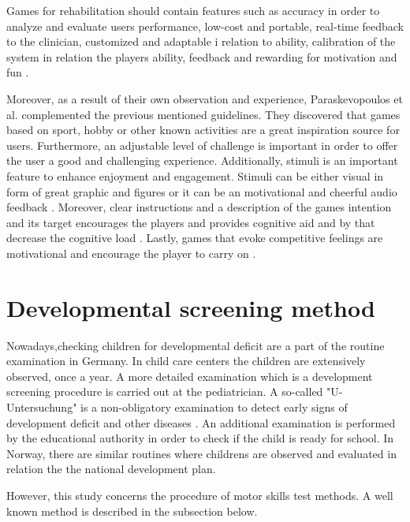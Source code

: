 Games for rehabilitation  should contain features such as accuracy in order to analyze and evaluate users performance, low-cost and portable, real-time feedback to the clinician, customized and adaptable i relation to ability, calibration of the system in relation the players ability, feedback and rewarding for motivation and fun \cite{Lewis2012}.

Moreover, as a result of their own observation and experience, Paraskevopoulos et al. complemented the previous mentioned guidelines. They discovered that games based on sport, hobby or other known activities are a great inspiration source for users. Furthermore, an adjustable level of challenge is important in order to offer the user a good and challenging experience. Additionally, stimuli is an important feature to enhance enjoyment and engagement. Stimuli can be either visual in form of great graphic and figures or it can be an motivational and cheerful audio feedback \cite{Paraskevopoulos2014}. Moreover, clear instructions and a description of the games intention and its target encourages the players and provides cognitive aid and by that decrease the cognitive load \cite{Paraskevopoulos2014, Koridon2016}. Lastly, games that evoke competitive feelings are motivational and encourage the player to carry on \cite{Paraskevopoulos2014}.




\section{Developmental screening method}
\label{sec:screeningmethod}
Nowadays,checking children for developmental deficit are a part of the routine examination in Germany. In child care centers the children are extensively observed, once a year.
A more detailed examination which is a development screening procedure is carried out at the pediatrician. A so-called "U-Untersuchung" is a non-obligatory examination to detect early signs of development deficit and other diseases \cite{kindergesundheitinfo, Uuntersuchung}.
An additional examination is performed by the educational authority in order to check if the child is ready for school.
In Norway, there are similar routines where childrens are observed and evaluated in relation the the national development plan.

However, this study concerns the procedure of motor skills test methods. A well known method is described in the subsection below. 


